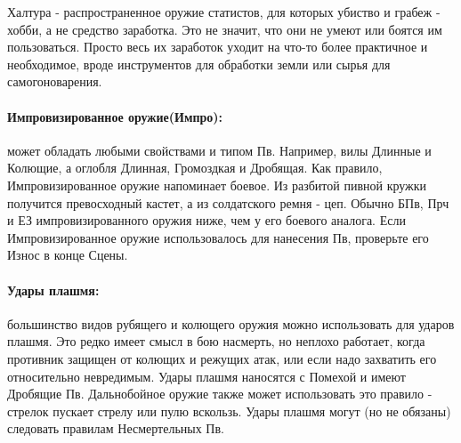 \begin{tcolorbox}
    Халтура - распространенное оружие статистов, для которых убиство и грабеж - хобби, а не средство заработка. Это не значит, что они не умеют или боятся им пользоваться. Просто весь их заработок уходит на что-то более практичное и необходимое, вроде инструментов для обработки земли или сырья для самогоноварения.
\end{tcolorbox}

\paragraph{Импровизированное оружие(Импро):} может обладать любыми свойствами и типом Пв. Например, вилы Длинные и Колющие, а оглобля Длинная, Громоздкая и Дробящая. Как правило, Импровизированное оружие напоминает боевое. Из разбитой пивной кружки получится превосходный кастет, а из солдатского ремня - цеп. 
\newline Обычно БПв, Прч и ЕЗ импровизированного оружия ниже, чем у его боевого аналога. 
\newline Если Импровизированное оружие использовалось для нанесения Пв, проверьте его Износ в конце Сцены.	

\paragraph{Удары плашмя:} большинство видов рубящего и колющего оружия можно использовать для ударов плашмя. Это редко имеет смысл в бою насмерть, но неплохо работает, когда противник защищен от колющих и режущих атак, или если надо захватить его относительно невредимым. 
\newline Удары плашмя наносятся с Помехой и имеют Дробящие Пв. Дальнобойное оружие также может использовать это правило - стрелок пускает стрелу или пулю вскользь. Удары плашмя могут (но не обязаны) следовать правилам Несмертельных Пв.

